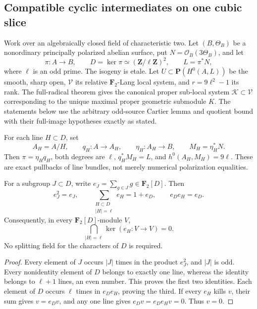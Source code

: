 \subsection{Compatible cyclic intermediates on one cubic slice}
\label{subsec:compatible-cyclic-intermediates}

Work over an algebraically closed field of characteristic two. Let
\((B,\Theta_B)\) be a nonordinary principally polarized abelian
surface, put \(N=\mathcal O_B(3\Theta_B)\), and let
\[
 \pi:A\longrightarrow B,\qquad
 D=\ker\pi\simeq(\mathbf Z/\ell\mathbf Z)^2,
 \qquad L=\pi^*N,
 \tag{CCI1}
\]
where \(\ell\) is an odd prime. The isogeny is etale. Let
\(U\subset\mathbf P(H^0(A,L))\) be the smooth, sharp open,
\(\mathcal V\) its relative \(\mathbf F_2\)-Lang local system,
and \(r=9\ell^2-1\) its rank. The full-radical theorem gives
the canonical proper sub-local system \(\mathcal K\subset\mathcal V\)
corresponding to the unique maximal proper geometric submodule
\(K\). The statements below use the arbitrary odd-source
Cartier lemma and quotient bound with their full-image hypotheses
exactly as stated.

For each line \(H\subset D\), set
\[
 A_H=A/H,\qquad q_H:A\longrightarrow A_H,
 \qquad\eta_H:A_H\longrightarrow B,
 \qquad M_H=\eta_H^*N.
 \tag{CCI2}
\]
Then \(\pi=\eta_Hq_H\), both degrees are \(\ell\),
\(q_H^*M_H=L\), and \(h^0(A_H,M_H)=9\ell\).
These are exact pullbacks of line bundles, not merely numerical
polarization equalities.

\begin{lemma}
\label{lem:compatible-line-averaging}
For a subgroup \(J\subset D\), write
\(e_J=\sum_{g\in J}g\in\mathbf F_2[D]\).
Then
\[
 e_J^2=e_J,\qquad
 \sum_{\substack{H\subset D\\ |H|=\ell}}e_H=1+e_D,
 \qquad e_De_H=e_D.
 \tag{CCI3}
\]
Consequently, in every \(\mathbf F_2[D]\)-module \(V\),
\[
                  \bigcap_{|H|=\ell}\ker(e_H:V\to V)=0.
 \tag{CCI4}
\]
No splitting field for the characters of \(D\) is required.
\end{lemma}
\begin{proof}
Every element of \(J\) occurs \(|J|\) times in the product
\(e_J^2\), and \(|J|\) is odd. Every nonidentity element of
\(D\) belongs to exactly one line, whereas the identity belongs
to \(\ell+1\) lines, an even number. This proves the first
two identities. Each element of \(D\) occurs \(\ell\)
times in \(e_De_H\), proving the third. If every \(e_H\)
kills \(v\), their sum gives \(v=e_Dv\), and any one line
gives \(e_Dv=e_De_Hv=0\). Thus \(v=0\).
\end{proof}

